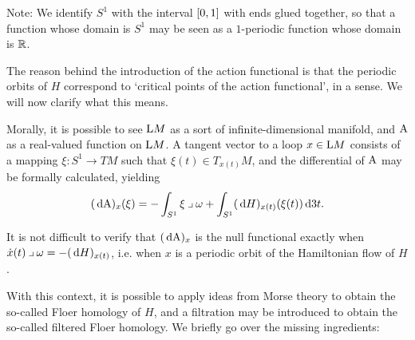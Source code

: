 Note: We identify $S^1$ with the interval $\interval01$ with ends glued together, so that a function whose domain is $S^1$ may be seen as a $1$-periodic function whose domain is $\R$.

The reason behind the introduction of the action functional is that the periodic orbits of $H$ correspond to `critical points of the action functional', in a sense. We will now clarify what this means.

Morally, it is possible to see $\LL M$ as a sort of infinite-dimensional manifold, and $\AA$ as a real-valued function on $\LL M$. A tangent vector to a loop $x \in \LL M$ consists of a mapping $\xi \colon S^1 \to TM$ such that $\xi(t) \in T_{x(t)} M$, and the differential of $\AA$ may be formally calculated, yielding
\begin{equation}
(\dl \AA)_x(\xi) = - \int_{S^1} \xi \into \omega + \int_{S^1} (\dl H)_{x(t)} (\xi(t)) \dl3t. 
\end{equation}

It is not difficult to verify that $(\dl \AA)_x$ is the null functional exactly when $\dot x(t) \into \omega = - (\dl H)_{x(t)}$, i.e. when $x$ is a periodic orbit of the Hamiltonian flow of $H$.

With this context, it is possible to apply ideas from Morse theory to obtain the so-called Floer homology of $H$, and a filtration may be introduced to obtain the so-called filtered Floer homology. We briefly go over the missing ingredients:

